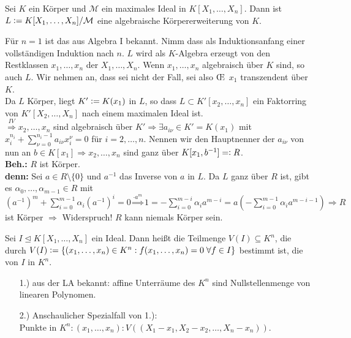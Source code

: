 \documentclass[a4paper, 10pt]{report}
\begin{document}
\begin{Satz}
\label{Satz5}
  Sei $K$ ein Körper und $\mathcal{M}$ ein maximales Ideal in $K[X_1, \dots,
  X_n]$. Dann ist $L \mathrel{\mathop:}= K[X_1, \dots, X_n] / \mathcal{M}$ eine algebraische
  Körpererweiterung von $K$.
\end{Satz}

\begin{Bew}
  Für $n=1$ ist das aus Algebra I bekannt. Nimm dass als Induktionsanfang einer
  vollständigen Induktion nach $n$.
  $L$ wird als $K$-Algebra erzeugt von den Restklassen $x_1, \dots, x_n$ der
  $X_1, \dots, X_n$. Wenn $x_1, \dots, x_n$ algebraisch über $K$ sind, so auch
  $L$. Wir nehmen an, dass sei nicht der Fall, sei also \OE\ $x_1$ transzendent
  über $K$.\\
  Da $L$ Körper, liegt $K' \mathrel{\mathop:}= K(x_1)$ in $L$, so dass $L \subset K'[x_2,
  \dots, x_n]$ ein Faktorring von $K'[X_2, \dots, X_n]$ nach einem maximalen
  Ideal ist.\\
  $\overset{IV}{\Rightarrow} x_2, \dots, x_n$ sind algebraisch über $K'
  \Rightarrow \exists a_{i \nu} \in K'=K(x_1)$ mit $x_i^{n_i} + \sum_{\nu =
  0}^{n_i -1} a_{i \nu} x_i^{\nu} = 0$ für $i = 2, \dots, n$.
  Nennen wir den Hauptnenner der $a_{i \nu}$ von nun an $b \in K[x_1] \Rightarrow
  x_2, \dots, x_n$ sind ganz über $K[x_1, b^{-1}] =\mathrel{\mathop:} R$.\\
  \textbf{Beh.:} $R$ ist Körper.\\
  \textbf{denn:} Sei $a \in R \setminus \{0\}$ und $a^{-1}$ das Inverse von $a$
  in $L$. Da $L$ ganz über $R$ ist, gibt es $\alpha_0, \dots, \alpha_{m-1} \in
  R$ mit $(a^{-1})^m + \sum_{i = 0}^{m-1} \alpha_i (a^{-1})^i = 0 \overset{
  \cdot a^m}{\Rightarrow} 1 = -\sum_{i=0}^{m-i} \alpha_i a^{m-i} = a
  (-\sum_{i=0}^{m-1} \alpha_i a^{m-i-1}) \Rightarrow R$ ist Körper $\Rightarrow$
  Widerspruch! $R$ kann niemals Körper sein.
\end{Bew}

\begin{Def}
  Sei $I \trianglelefteq K[X_1, \dots, X_n]$ ein Ideal. Dann heißt die Teilmenge
  $V(I) \subseteq K^n$, die durch $V(I) \mathrel{\mathop:}= \{(x_1, \dots, x_n) \in K^n:
  f(x_1, \dots, x_n) = 0 \; \forall f \in I\}$ bestimmt ist, die
   von $I$ in $K^n$.
\end{Def}

\begin{nnBsp} 
  \begin{enumerate}
    \item[1.)] aus der LA bekannt: affine Unterräume des $K^n$ sind
               Nullstellenmenge von linearen Polynomen.
    \item[2.)] Anschaulicher Spezialfall von 1.):\\
               Punkte in $K^n: (x_1, \dots, x_n): V((X_1-x_1, X_2 - x_2, \dots,
               X_n - x_n))$.
  \end{enumerate}
\end{nnBsp}
\end{document}
